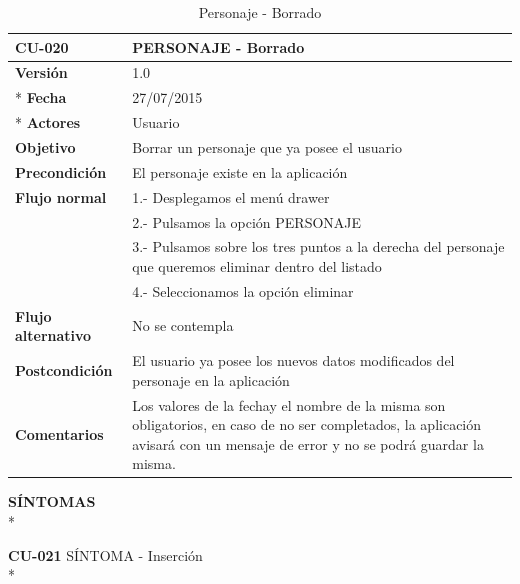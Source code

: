\documentclass[../pfc.tex]{subfiles}
\begin{document}
		\begin{table}[H]
			\centering
			\begin{tabular}[t]{|p{3cm}|p{9.5cm}|}
				\hline \textbf{CU-020} & \textbf{PERSONAJE - Borrado} \\*
				\hline\hline \textbf{Versión} & 1.0 \\ *
				\hline\hline \textbf{Fecha} & 27/07/2015 \\ *
				\hline\textbf{Actores} 	& Usuario\\*
				\hline \textbf{Objetivo} & Borrar un personaje que ya posee el usuario\\* 			
				\hline \textbf{Precondición} & El personaje existe en la aplicación\\* 
				\hline \textbf{Flujo normal} & 1.- Desplegamos el menú drawer \\* 
				& 2.- Pulsamos la opción PERSONAJE\\*	
				& 3.- Pulsamos sobre los tres puntos a la derecha del personaje que queremos eliminar dentro del listado\\*	
				& 4.- Seleccionamos la opción eliminar\\*	
				\hline \textbf{Flujo alternativo} & No se contempla \\* 
				\hline \textbf{Postcondición} & El usuario ya posee los nuevos datos modificados del personaje en la aplicación \\* 
				\hline \textbf{Comentarios}   & Los valores de la fechay el nombre de la misma son obligatorios, en caso de no ser completados, la aplicación avisará con un mensaje de error y no se podrá guardar la misma.\\*
				\hline
			\end{tabular}
			\caption{Personaje - Borrado}
			\label{tabla:caso020}
		\end{table}
		
		
		
	\textbf{SÍNTOMAS}\\*
	
	\textbf{CU-021}	SÍNTOMA - Inserción\\*
	
\end{document}
